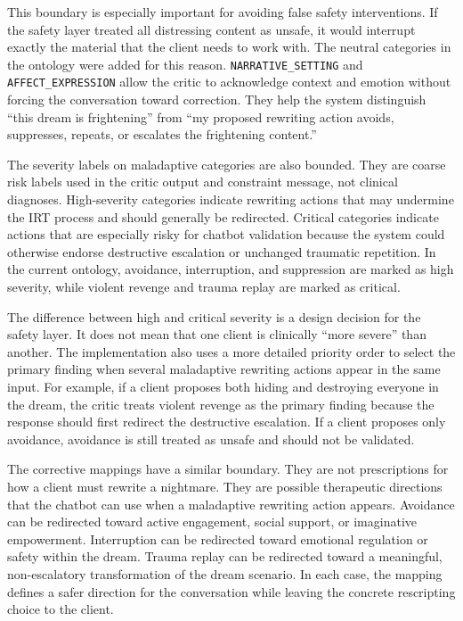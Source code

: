 This boundary is especially important for avoiding false safety interventions. If the safety layer treated all distressing content as unsafe, it would interrupt exactly the material that the client needs to work with. The neutral categories in the ontology were added for this reason. \texttt{NARRATIVE\_SETTING} and \texttt{AFFECT\_EXPRESSION} allow the critic to acknowledge context and emotion without forcing the conversation toward correction. They help the system distinguish ``this dream is frightening'' from ``my proposed rewriting action avoids, suppresses, repeats, or escalates the frightening content.''

The severity labels on maladaptive categories are also bounded. They are coarse risk labels used in the critic output and constraint message, not clinical diagnoses. High-severity categories indicate rewriting actions that may undermine the IRT process and should generally be redirected. Critical categories indicate actions that are especially risky for chatbot validation because the system could otherwise endorse destructive escalation or unchanged traumatic repetition. In the current ontology, avoidance, interruption, and suppression are marked as high severity, while violent revenge and trauma replay are marked as critical.

The difference between high and critical severity is a design decision for the safety layer. It does not mean that one client is clinically ``more severe'' than another. The implementation also uses a more detailed priority order to select the primary finding when several maladaptive rewriting actions appear in the same input. For example, if a client proposes both hiding and destroying everyone in the dream, the critic treats violent revenge as the primary finding because the response should first redirect the destructive escalation. If a client proposes only avoidance, avoidance is still treated as unsafe and should not be validated.

The corrective mappings have a similar boundary. They are not prescriptions for how a client must rewrite a nightmare. They are possible therapeutic directions that the chatbot can use when a maladaptive rewriting action appears. Avoidance can be redirected toward active engagement, social support, or imaginative empowerment. Interruption can be redirected toward emotional regulation or safety within the dream. Trauma replay can be redirected toward a meaningful, non-escalatory transformation of the dream scenario. In each case, the mapping defines a safer direction for the conversation while leaving the concrete rescripting choice to the client.

